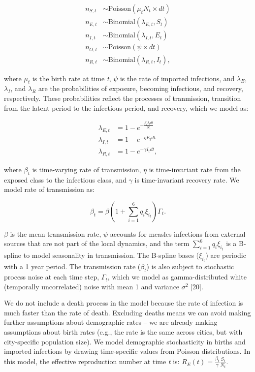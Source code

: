 \documentclass[3p]{elsarticle} %
\begin{document}
\begin{align}
n_{S,t} &\sim \text{Poisson}(\mu_t N_t \times dt) \\
n_{E,t} &\sim \text{Binomial}(\lambda_{E,t}, S_{t}) \\
n_{I,t} &\sim \text{Binomial}(\lambda_{I,t}, E_{t}) \\
n_{O,t} &\sim \text{Poisson}(\psi \times dt) \\
n_{R,t} &\sim \text{Binomial}(\lambda_{R,t}, I_{t}),
\end{align}

\noindent{}where \(\mu_t\) is the birth rate at time \emph{t}, \(\psi\)
is the rate of imported infections, and \(\lambda_E\), \(\lambda_I\),
and \(\lambda_R\) are the probabilities of exposure, becoming
infectious, and recovery, respectively. These probabilities reflect the
processes of tranmission, transition from the latent period to the
infectious period, and recovery, which we model as:

\begin{align}
\lambda_{E,t} &= 1 - e^{-\frac{\beta_t I_t dt}{N_t}} \\
\lambda_{I,t} &= 1 - e^{-\eta E_{t} dt} \\
\lambda_{R,t} &= 1 - e^{-\gamma I_{t} dt},
\end{align}

\noindent{}where \(\beta_t\) is time-varying rate of transmission,
\(\eta\) is time-invariant rate from the exposed class to the infectious
class, and \(\gamma\) is time-invariant recovery rate. We model rate of
transmission as:

\begin{equation}
\beta_t = \beta \left(1 + \sum^6_{i=1} q_i \xi_{i_{t}} \right) \Gamma_t.
\end{equation}

\(\beta\) is the mean transmission rate, \(\psi\) accounts for measles
infections from external sources that are not part of the local
dynamics, and the term \(\sum^6_{i=1} q_i \xi_{i_{t}}\) is a B-spline to
model seasonality in transmission. The B-spline bases (\(\xi_{i_{t}}\))
are periodic with a 1 year period. The transmission rate (\(\beta_t\))
is also subject to stochastic process noise at each time step,
\(\Gamma_t\), which we model as gamma-distributed white (temporally
uncorrelated) noise with mean 1 and variance \(\sigma^2\) {[}20{]}.

We do not include a death process in the model because the rate of
infection is much faster than the rate of death. Excluding deaths means
we can avoid making further assumptions about demographic rates -- we
are already making assumptions about birth rates (e.g., the rate is the
same across cities, but with city-specific population size). We model
demographic stochasticity in births and imported infections by drawing
time-specific values from Poisson distributions. In this model, the
effective reproduction number at time \emph{t} is:
\(R_E(t) = \frac{\beta_t}{\gamma} \frac{S_t}{N_t}\).
\end{document}
